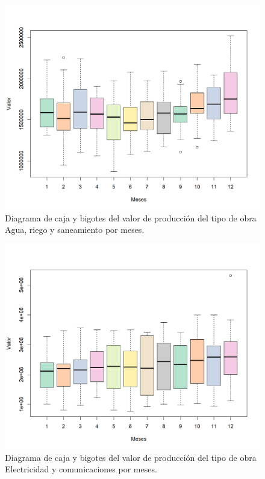 \documentclass{article}
\begin{document}
\begin{center}
\begin{figure}[H]
\includegraphics[scale=0.8]{boxplot2.png}
\caption{Diagrama de caja y bigotes del valor de producción del tipo de obra Agua, riego y saneamiento por meses.}
\label{fig:fig2}
\end{figure}
\end{center}

\begin{center}
\begin{figure}[H]
\includegraphics[scale=0.8]{boxplot3.png}
\caption{Diagrama de caja y bigotes del valor de producción del tipo de obra Electricidad y comunicaciones por meses.}
\label{fig:fig3}
\end{figure}
\end{center}
\end{document}
